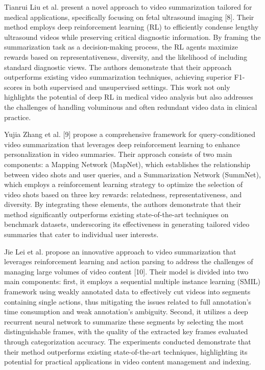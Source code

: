 \documentclass[conference]{IEEEtran}
\begin{document}
Tianrui Liu et al. present a novel approach to video summarization tailored for medical applications, specifically focusing on fetal ultrasound imaging [8]. Their method employs deep reinforcement learning (RL) to efficiently condense lengthy ultrasound videos while preserving critical diagnostic information. By framing the summarization task as a decision-making process, the RL agents maximize rewards based on representativeness, diversity, and the likelihood of including standard diagnostic views. The authors demonstrate that their approach outperforms existing video summarization techniques, achieving superior F1-scores in both supervised and unsupervised settings. This work not only highlights the potential of deep RL in medical video analysis but also addresses the challenges of handling voluminous and often redundant video data in clinical practice.

Yujia Zhang et al. [9] propose a comprehensive framework for query-conditioned video summarization that leverages deep reinforcement learning to enhance personalization in video summaries. Their approach consists of two main components: a Mapping Network (MapNet), which establishes the relationship between video shots and user queries, and a Summarization Network (SummNet), which employs a reinforcement learning strategy to optimize the selection of video shots based on three key rewards: relatedness, representativeness, and diversity. By integrating these elements, the authors demonstrate that their method significantly outperforms existing state-of-the-art techniques on benchmark datasets, underscoring its effectiveness in generating tailored video summaries that cater to individual user interests.

Jie Lei et al. propose an innovative approach to video summarization that leverages reinforcement learning and action parsing to address the challenges of managing large volumes of video content [10]. Their model is divided into two main components: first, it employs a sequential multiple instance learning (SMIL) framework using weakly annotated data to effectively cut videos into segments containing single actions, thus mitigating the issues related to full annotation's time consumption and weak annotation's ambiguity. Second, it utilizes a deep recurrent neural network to summarize these segments by selecting the most distinguishable frames, with the quality of the extracted key frames evaluated through categorization accuracy. The experiments conducted demonstrate that their method outperforms existing state-of-the-art techniques, highlighting its potential for practical applications in video content management and indexing.
\end{document}
